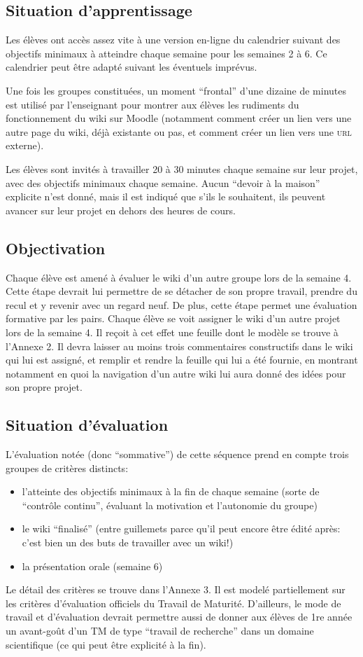 \documentclass[11pt,bibliography=totoc]{scrartcl}
\begin{document}
\subsection{Situation d'apprentissage}
Les élèves ont accès assez vite à une version en-ligne du calendrier suivant des
objectifs minimaux à atteindre chaque semaine pour les semaines 2 à 6. Ce
calendrier peut être adapté suivant les éventuels imprévus.

Une fois les groupes constituées, un moment ``frontal'' d'une dizaine de minutes
est utilisé par l'enseignant pour montrer aux élèves les rudiments du
fonctionnement du wiki sur Moodle (notamment comment créer un lien vers une
autre page du wiki, déjà existante ou pas, et comment créer un lien vers une
\textsc{url} externe).

Les élèves sont invités à travailler 20 à 30 minutes chaque semaine sur leur
projet, avec des objectifs minimaux chaque semaine. Aucun ``devoir à la maison''
explicite n'est donné, mais il est indiqué que s'ils le souhaitent, ils peuvent
avancer sur leur projet en dehors des heures de cours.

\subsection{Objectivation}
Chaque élève est amené à évaluer le wiki d'un autre groupe lors de la semaine
4. Cette étape devrait lui permettre de se détacher de son propre travail,
prendre du recul et y revenir avec un regard neuf. De plus, cette étape permet
une évaluation formative par les pairs. Chaque élève se voit assigner le wiki
d'un autre projet lors de la semaine 4. Il reçoit à cet effet une feuille dont
le modèle se trouve à l'Annexe 2. Il devra laisser au moins trois commentaires
constructifs dans le wiki qui lui est assigné, et remplir et rendre la feuille
qui lui a été fournie, en montrant notamment en quoi la navigation d'un autre
wiki lui aura donné des idées pour son propre projet.

\subsection{Situation d'évaluation}
L'évaluation notée (donc ``sommative'') de cette séquence prend en compte trois
groupes de critères distincts:
\begin{itemize}
\item l'atteinte des objectifs minimaux à la fin de chaque semaine (sorte de
  ``contrôle continu'', évaluant la motivation et l'autonomie du groupe)
\item le wiki ``finalisé'' (entre guillemets parce qu'il peut encore être édité
  après: c'est bien un des buts de travailler avec un wiki!)
\item la présentation orale (semaine 6)
\end{itemize}
Le détail des critères se trouve dans l'Annexe 3. Il est modelé partiellement
sur les critères d'évaluation officiels du Travail de Maturité. D'ailleurs, le
mode de travail et d'évaluation devrait permettre aussi de donner aux élèves de
1re année un avant-goût d'un TM de type ``travail de recherche'' dans un domaine
scientifique (ce qui peut être explicité à la fin).
\end{document}

